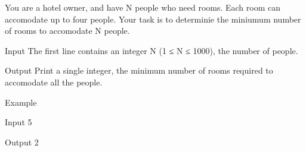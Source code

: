 
You are a hotel owner, and have N people who need rooms. Each room can accomodate up to four people. Your task is to determinie the miniumum number of rooms to accomodate N people.

Input
    The first line contains an integer N (1 ≤ N ≤ 1000), the number of people.

Output
    Print a single integer, the minimum number of rooms required to accomodate all the people.

Example

Input
5

Output
2
